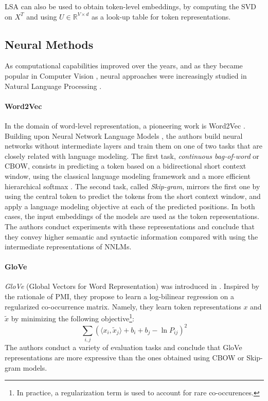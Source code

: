 LSA can also be used to obtain token-level embeddings, by computing the SVD on $X^T$ and using $U \in \mathbb{R}^{V \times d}$ as a look-up table for token representations.


\subsection{Neural Methods}

As computational capabilities improved over the years, and as they became popular in Computer Vision \citep{alexnet}, neural approaches were increasingly studied in Natural Language Processing \citep{billingsley-curran-2012-improvements,cho-etal-2014-learning}.

\paragraph*{Word2Vec} In the domain of word-level representation, a pioneering work is Word2Vec \citep{word2vec}. Building upon Neural Network Language Models \citep{bengio2000neural}, the authors build neural networks without intermediate layers and train them on one of two tasks that are closely related with language modeling. The first task, \textit{continuous bag-of-word} or CBOW, consists in predicting a token based on a bidirectional short context window, using the classical language modeling framework and a more efficient hierarchical softmax \citep{pmlr-vR5-morin05a}. The second task, called \textit{Skip-gram}, mirrors the first one by using the central token to predict the tokens from the short context window, and apply a language modeling objective at each of the predicted positions. In both cases, the input embeddings of the models are used as the token representations. The authors conduct experiments with these representations and conclude that they convey higher semantic and syntactic information compared with using the intermediate representations of NNLMs.

\paragraph*{GloVe} 
\textit{GloVe} (Global Vectors for Word Representation) was introduced in \citet{pennington-etal-2014-glove}. Inspired by the rationale of PMI, they propose to learn a log-bilinear regression on a regularized co-occurrence matrix. Namely, they learn token representations $x$ and $\tilde{x}$ by minimizing the following objective\footnote{In practice, a regularization term is used to account for rare co-occurences.}:
$$
\sum_{i, j} (\langle x_i, \tilde{x}_j \rangle + b_i + b_j - \ln P_{ij})^2
$$
The authors conduct a variety of evaluation tasks and conclude that GloVe representations are more expressive than the ones obtained using CBOW or Skip-gram models.

